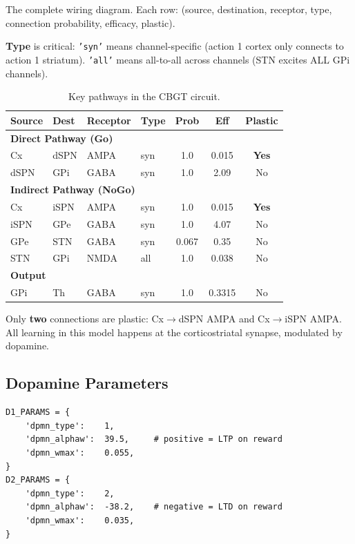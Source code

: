 \documentclass[11pt,a4paper]{article}
\begin{document}
The complete wiring diagram. Each row: (source, destination, receptor, type, connection probability, efficacy, plastic).

\textbf{Type} is critical: \texttt{'syn'} means channel-specific (action 1 cortex only connects to action 1 striatum). \texttt{'all'} means all-to-all across channels (STN excites ALL GPi channels).

\begin{table}[h]
\centering
\caption{Key pathways in the CBGT circuit.}
\small
\begin{tabular}{llllccc}
\toprule
Source & Dest & Receptor & Type & Prob & Eff & Plastic \\
\midrule
\multicolumn{7}{l}{\textbf{Direct Pathway (Go)}} \\
Cx & dSPN & AMPA & syn & 1.0 & 0.015 & \textbf{Yes} \\
dSPN & GPi & GABA & syn & 1.0 & 2.09 & No \\
\midrule
\multicolumn{7}{l}{\textbf{Indirect Pathway (NoGo)}} \\
Cx & iSPN & AMPA & syn & 1.0 & 0.015 & \textbf{Yes} \\
iSPN & GPe & GABA & syn & 1.0 & 4.07 & No \\
GPe & STN & GABA & syn & 0.067 & 0.35 & No \\
STN & GPi & NMDA & all & 1.0 & 0.038 & No \\
\midrule
\multicolumn{7}{l}{\textbf{Output}} \\
GPi & Th & GABA & syn & 1.0 & 0.3315 & No \\
\bottomrule
\end{tabular}
\end{table}

Only \textbf{two} connections are plastic: Cx$\rightarrow$dSPN AMPA and Cx$\rightarrow$iSPN AMPA. All learning in this model happens at the corticostriatal synapse, modulated by dopamine.

\subsection{Dopamine Parameters}

\begin{lstlisting}
D1_PARAMS = {
    'dpmn_type':    1,
    'dpmn_alphaw':  39.5,     # positive = LTP on reward
    'dpmn_wmax':    0.055,
}
D2_PARAMS = {
    'dpmn_type':    2,
    'dpmn_alphaw':  -38.2,    # negative = LTD on reward
    'dpmn_wmax':    0.035,
}
\end{lstlisting}
\end{document}
